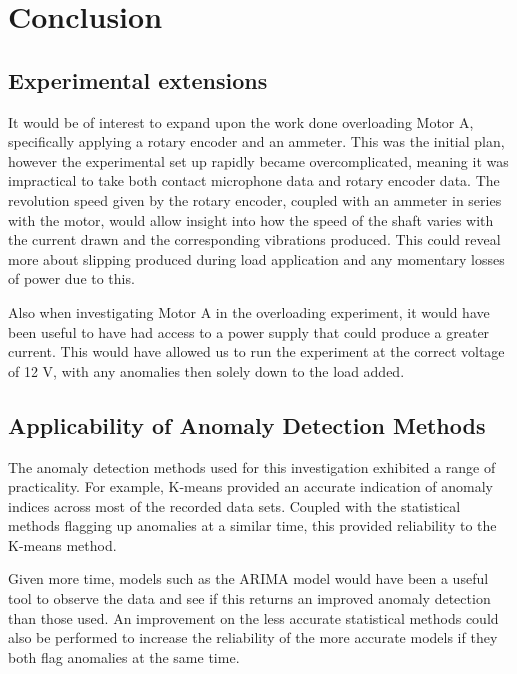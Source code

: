 \section{Conclusion}
\label{sec:conclusion}

\subsection{Experimental extensions }

It would be of interest to expand upon the work done overloading Motor A, specifically applying a rotary encoder and an ammeter. This was the initial plan, however the experimental set up rapidly became overcomplicated, meaning it was impractical to take both contact microphone data and rotary encoder data. The revolution speed given by the rotary encoder, coupled with an ammeter in series with the motor, would allow insight into how the speed of the shaft varies with the current drawn and the corresponding vibrations produced. This could reveal more about slipping produced during load application and any momentary losses of power due to this. 


Also when investigating Motor A in the overloading experiment, it would have been useful to have had access to a power supply that could produce a greater current. This would have allowed us to run the experiment at the correct voltage of 12 V, with any anomalies then solely down to the load added.


\subsection{Applicability of Anomaly Detection Methods}

The anomaly detection methods used for this investigation exhibited a range of practicality. For example, K-means provided an accurate indication of anomaly indices across most of the recorded data sets. Coupled with the statistical methods flagging up anomalies at a similar time, this provided reliability to the K-means method.

Given more time, models such as the ARIMA model would have been a useful tool to observe the data and see if this returns an improved anomaly detection than those used. An improvement on the less accurate statistical methods could also be performed to increase the reliability of the more accurate models if they both flag anomalies at the same time.

